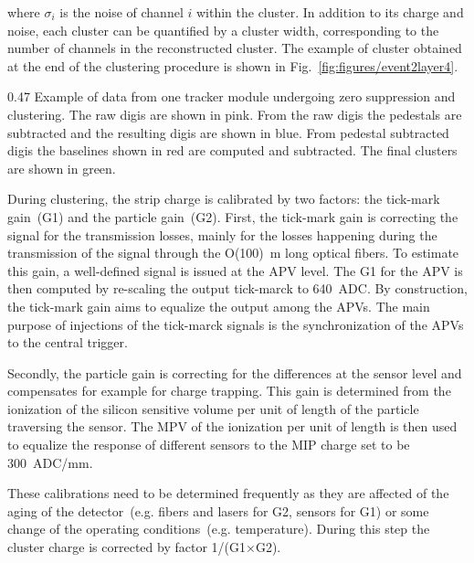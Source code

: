 where $\sigma_{i}$ is the noise of channel $i$ within the cluster. In addition to its charge and noise, each cluster can be quantified by a cluster width, corresponding to the number of channels in the reconstructed cluster. The example of cluster obtained at the end of the clustering procedure is shown in Fig.~\ref{fig:figures/event2layer4}.

                 {0.47}       %
                 {Example of data from one tracker module undergoing zero suppression and clustering. The raw digis are shown in pink. From the raw digis the pedestals are subtracted and the resulting digis are shown in blue. From pedestal subtracted digis the baselines shown in red are computed and subtracted. The final clusters are shown in green.} %


During clustering, the strip charge is calibrated by two factors: the tick-mark gain~(G1) and the particle gain~(G2). First, the tick-mark gain is correcting the signal for the transmission losses, mainly for the losses happening during the transmission of the signal through the O(100)~m long optical fibers. To estimate this gain, a well-defined signal is issued at the APV level. The G1 for the APV is then computed by re-scaling the output tick-marck to 640~ADC. By construction, the tick-mark gain aims to equalize the output among the APVs. The main purpose of injections of the tick-marck signals is the synchronization of the APVs to the central trigger.

Secondly, the particle gain is correcting for the differences at the sensor level and compensates for example for charge trapping. This gain is determined from the ionization of the silicon sensitive volume per unit of length of the particle traversing the sensor. The MPV of the ionization per unit of length is then used to equalize the response of different sensors to the MIP charge set to be 300~ADC/mm. 

These calibrations need to be determined frequently as they are affected of the aging of the detector~(e.g. fibers and lasers for G2,  sensors for G1) or some change of the operating conditions~(e.g. temperature). During this step the cluster charge is corrected by factor 1/(G1$\times$G2).

